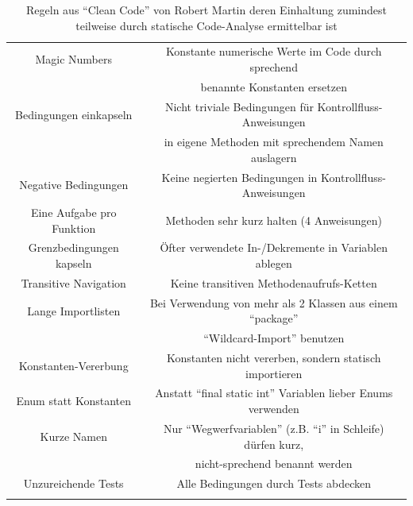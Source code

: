 \documentclass[da,ngerman]{stthesis}
\begin{document}
\begin{center}
\begin{longtabu}{|c|c|}
  						\hline
  						Magic Numbers & Konstante numerische Werte im Code durch sprechend \\ & benannte Konstanten ersetzen \\
  						\hline
  						Bedingungen einkapseln & Nicht triviale Bedingungen für Kontrollfluss-Anweisungen \\ & in eigene Methoden mit sprechendem Namen auslagern \\  
  						\hline
  						Negative Bedingungen & Keine negierten Bedingungen in Kontrollfluss-Anweisungen \\
  						\hline
  						Eine Aufgabe pro Funktion & Methoden sehr kurz halten (4 Anweisungen) \\
  						\hline
  						Grenzbedingungen kapseln & Öfter verwendete In-/Dekremente in Variablen ablegen \\
  						\hline
  						Transitive Navigation & Keine transitiven Methodenaufrufs-Ketten \\
  						\hline
  						Lange Importlisten & Bei Verwendung von mehr als 2 Klassen aus einem "`package"' \\ & "`Wildcard-Import"' benutzen \\
  						\hline
  						Konstanten-Vererbung & Konstanten nicht vererben, sondern statisch importieren \\
  						\hline
  						Enum statt Konstanten & Anstatt "`final static int"' Variablen lieber Enums verwenden \\
  						\hline
  						Kurze Namen & Nur "`Wegwerfvariablen"' (z.B. "`i"' in Schleife) dürfen kurz, \\ & nicht-sprechend benannt werden \\
  						\hline  
  						Unzureichende Tests & Alle Bedingungen durch Tests abdecken \\
  						\hline   
  						\caption{Regeln aus "`Clean Code"' von Robert Martin deren Einhaltung zumindest teilweise durch statische Code-Analyse ermittelbar ist \cite{CleanCode}}
						\label{cleancoderules}
  					\end{longtabu}   
  				\end{center}
\end{document}
